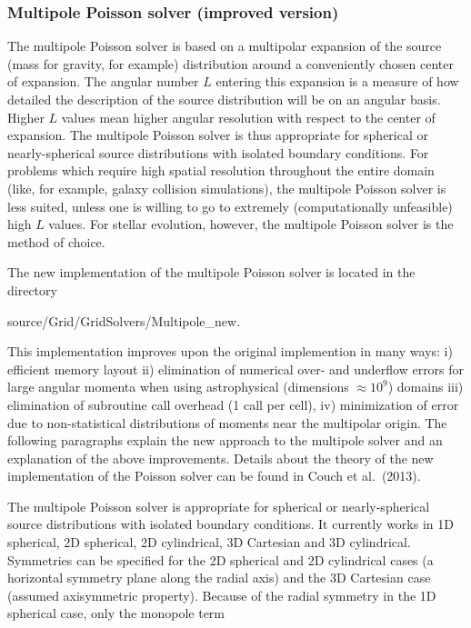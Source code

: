 \subsubsection{Multipole Poisson solver (improved version)}
\label{Sec:GridSolversMultipoleImproved}

The multipole Poisson solver is based on a multipolar expansion of the source (mass for gravity,
for example) distribution around a conveniently chosen center of expansion. The angular number
$L$ entering this expansion is a measure of how detailed the description of the source
distribution will be on an angular basis. Higher $L$ values mean higher angular resolution with
respect to the center of expansion. The multipole Poisson solver is thus appropriate for spherical
or nearly-spherical source distributions with isolated boundary conditions. For problems which
require high spatial resolution throughout the entire domain (like, for example, galaxy collision
simulations), the multipole Poisson solver is less suited, unless one is willing to go to extremely
(computationally unfeasible) high $L$ values. For stellar evolution, however, the multipole
Poisson solver is the method of choice.
\par
The new implementation of the multipole Poisson solver is located in the directory
\begin{codeseg}
source/Grid/GridSolvers/Multipole_new.
\end{codeseg}
This implementation improves upon the original implemention in many ways:
i) efficient memory layout 
ii) elimination of numerical over- and underflow
errors for large angular momenta when using astrophysical
(dimensions $\approx 10^9$) domains
iii) elimination of subroutine call overhead (1 call per cell),
iv) minimization of error due to non-statistical distributions of
moments near the multipolar origin. The following paragraphs explain
the new approach to the multipole solver and an explanation of the
above improvements. Details about the theory of the new implementation of the Poisson solver
can be found in Couch et al.~(2013).
\par
The multipole Poisson solver is appropriate for spherical or nearly-spherical
source distributions with isolated boundary conditions. It currently works in
1D spherical, 2D spherical, 2D cylindrical, 3D Cartesian and 3D cylindrical. Symmetries
can be specified for the 2D spherical and 2D cylindrical cases (a horizontal symmetry plane
along the radial axis) and the 3D Cartesian case (assumed axisymmetric property).
Because of the radial symmetry in the 1D spherical case, only the monopole term
